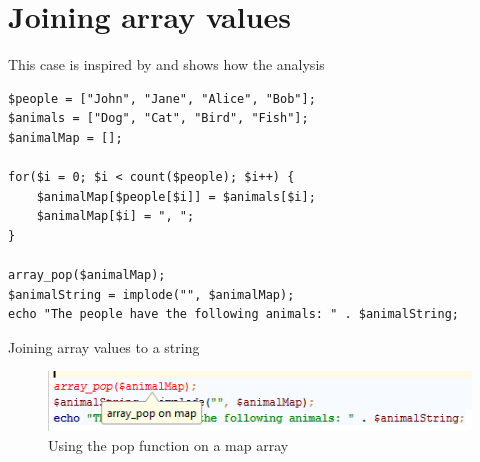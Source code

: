\section{Joining array values}
This case is inspired by  and shows how the analysis 

\begin{program}
\begin{lstlisting}
$people = ["John", "Jane", "Alice", "Bob"];
$animals = ["Dog", "Cat", "Bird", "Fish"];
$animalMap = [];

for($i = 0; $i < count($people); $i++) {
    $animalMap[$people[$i]] = $animals[$i];
    $animalMap[$i] = ", ";
}

array_pop($animalMap);
$animalString = implode("", $animalMap);
echo "The people have the following animals: " . $animalString;
\end{lstlisting}
\caption{Joining array values to a string}
\label{lst:arrayPopExample}
\end{program}

\begin{figure}[htbp]
\centering
\includegraphics[scale=0.6]{chapters/caseStudy/popError}
\caption{Using the pop function on a map array}
\label{fig:arrayPopScreenshot}
\end{figure}